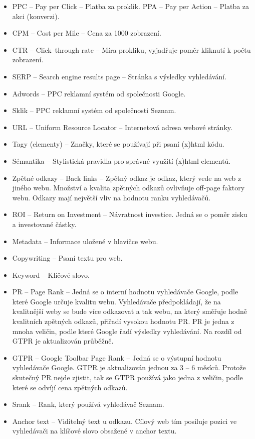 \begin{itemize}
\item PPC – Pay per Click – Platba za proklik. PPA – Pay per Action – Platba za akci (konverzi).
\item CPM – Cost per Mile – Cena za 1000 zobrazení.
\item CTR – Click–through rate – Míra prokliku, vyjadřuje poměr kliknutí k počtu zobrazení.
\item SERP – Search engine results page – Stránka s výsledky vyhledávání.
\item Adwords – PPC reklamní systém od společnosti Google.
\item Sklik – PPC reklamní systém od společnosti Seznam.
\item URL – Uniform Resource Locator – Internetová adresa webové stránky.
\item Tagy (elementy) – Značky, které se používají při psaní (x)html kódu.
\item Sémantika – Stylistická pravidla pro správné využití (x)html elementů.
\item Zpětné odkazy – Back links – Zpětný odkaz je odkaz, který vede na web z jiného webu. Množství a kvalita zpětných odkazů ovlivňuje off-page faktory webu. Odkazy mají největší vliv na hodnotu ranku vyhledávačů.
\item ROI – Return on Investment – Návratnost investice. Jedná se o poměr zisku a investované částky.
\item Metadata – Informace uložené v hlavičce webu.
\item Copywriting – Psaní textu pro web.
\item Keyword – Klíčové slovo.
\item PR – Page Rank – Jedná se o interní hodnotu vyhledávače Google, podle které Google určuje kvalitu webu. Vyhledávače předpokládají, že na kvalitnější weby se bude více odkazovat a tak webu, na který směřuje hodně kvalitních zpětných odkazů, přiřadí vysokou hodnotu PR. PR je jedna z mnoha veličin, podle které Google řadí výsledky vyhledávání. Na rozdíl od GTPR je aktualizován průběžně.
\item GTPR – Google Toolbar Page Rank – Jedná se o výstupní hodnotu vyhledávače Google. GTPR je aktualizován jednou za 3 – 6 měsíců. Protože skutečný PR nejde zjistit, tak se GTPR používá jako jedna z veličin, podle které se odvíjí cena zpětných odkazů.
\item Srank – Rank, který používá vyhledávač Seznam.
\item Anchor text – Viditelný text u odkazu. Cílový web tím posiluje pozici ve vyhledávači na klíčové slovo obsažené v anchor textu.

\end{itemize}
